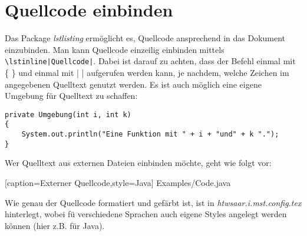 
\section{Quellcode einbinden}
Das Package \textit{lstlisting} ermöglicht es, Quellcode ansprechend in das Dokument einzubinden. Man kann Quellcode einzeilig einbinden 
mittels \lstinline{\lstinline|Quellcode|}. Dabei ist darauf zu achten, dass der Befehl einmal mit \{ \} und einmal mit | | aufgerufen werden kann, je nachdem, 
welche Zeichen im angegebenen Quelltext genutzt werden. 
Es ist auch möglich eine eigene Umgebung für Quelltext zu schaffen:

\begin{lstlisting}[caption=Erstes Listing,style=Java]
private Umgebung(int i, int k)
{
	System.out.println("Eine Funktion mit " + i + "und" + k ".");
}
\end{lstlisting}  

Wer Quelltext aus externen Dateien einbinden möchte, geht wie folgt vor:


[caption={Externer Quellcode},style=Java]
{Examples/Code.java}

Wie genau der Quellcode formatiert und gefärbt ist, ist in \textit{htwsaar.i.mst.config.tex} hinterlegt, wobei fü verschiedene Sprachen auch eigene Styles angelegt werden
können (hier z.B. für Java).